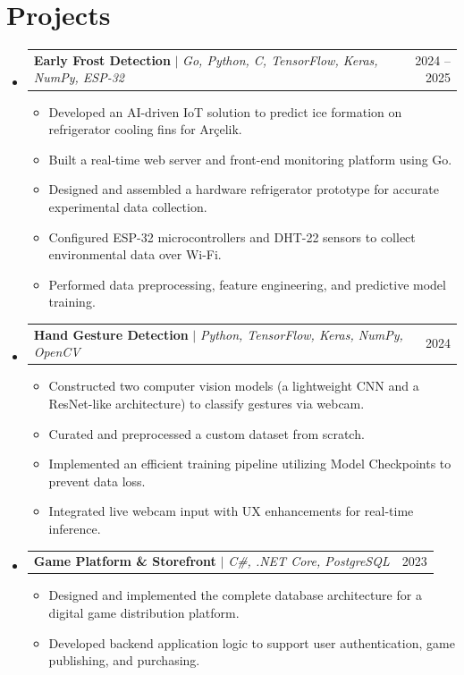 \documentclass[letterpaper,11pt]{article}
\makeatletter
\newcommand{\resumeItem}[1]{
  \item\small{
    {#1 \vspace{-2pt}}
  }
}
\newcommand{\resumeProjectHeading}[2]{
    \item
    \begin{tabular*}{0.97\textwidth}{l@{\extracolsep{\fill}}r}
      \small#1 & #2 \\
    \end{tabular*}\vspace{-7pt}
}
\newcommand{\resumeSubHeadingListStart}{\begin{itemize}[leftmargin=0.15in, label={}]}
\newcommand{\resumeSubHeadingListEnd}{\end{itemize}}
\newcommand{\resumeItemListStart}{\begin{itemize}}
\newcommand{\resumeItemListEnd}{\end{itemize}\vspace{-5pt}}
\makeatother
\begin{document}
\section{Projects}
    \resumeSubHeadingListStart
      \resumeProjectHeading
          {\textbf{Early Frost Detection} $|$ \emph{Go, Python, C, TensorFlow, Keras, NumPy, ESP-32}}{2024 -- 2025}
          \resumeItemListStart
            \resumeItem{Developed an AI-driven IoT solution to predict ice formation on refrigerator cooling fins for Arçelik.}
            \resumeItem{Built a real-time web server and front-end monitoring platform using Go.}
            \resumeItem{Designed and assembled a hardware refrigerator prototype for accurate experimental data collection.}
            \resumeItem{Configured ESP-32 microcontrollers and DHT-22 sensors to collect environmental data over Wi-Fi.}
            \resumeItem{Performed data preprocessing, feature engineering, and predictive model training.}
          \resumeItemListEnd
      \resumeProjectHeading
          {\textbf{Hand Gesture Detection} $|$ \emph{Python, TensorFlow, Keras, NumPy, OpenCV}}{2024}
          \resumeItemListStart
            \resumeItem{Constructed two computer vision models (a lightweight CNN and a ResNet-like architecture) to classify gestures via webcam.}
            \resumeItem{Curated and preprocessed a custom dataset from scratch.}
            \resumeItem{Implemented an efficient training pipeline utilizing Model Checkpoints to prevent data loss.}
            \resumeItem{Integrated live webcam input with UX enhancements for real-time inference.}
          \resumeItemListEnd
      \resumeProjectHeading
          {\textbf{Game Platform \& Storefront} $|$ \emph{C\#, .NET Core, PostgreSQL}}{2023}
          \resumeItemListStart
            \resumeItem{Designed and implemented the complete database architecture for a digital game distribution platform.}
            \resumeItem{Developed backend application logic to support user authentication, game publishing, and purchasing.}
          \resumeItemListEnd
    \resumeSubHeadingListEnd


\end{document}
